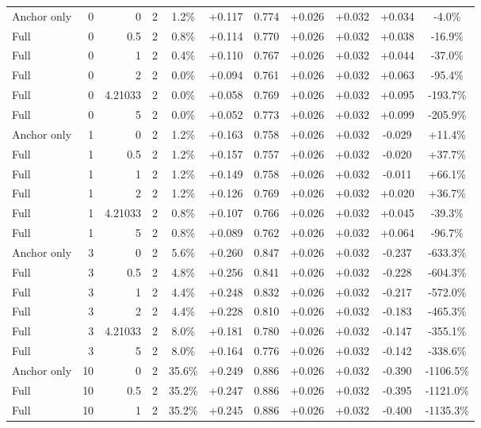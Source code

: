 \begin{table}[htbp]
\begin{tabular}{lrrrccccccc}
Anchor only & 0 & 0 & 2 & 1.2\% & +0.117 & 0.774 & +0.026 & +0.032 & +0.034 & -4.0\% \\
Full & 0 & 0.5 & 2 & 0.8\% & +0.114 & 0.770 & +0.026 & +0.032 & +0.038 & -16.9\% \\
Full & 0 & 1 & 2 & 0.4\% & +0.110 & 0.767 & +0.026 & +0.032 & +0.044 & -37.0\% \\
Full & 0 & 2 & 2 & 0.0\% & +0.094 & 0.761 & +0.026 & +0.032 & +0.063 & -95.4\% \\
Full & 0 & 4.21033 & 2 & 0.0\% & +0.058 & 0.769 & +0.026 & +0.032 & +0.095 & -193.7\% \\
Full & 0 & 5 & 2 & 0.0\% & +0.052 & 0.773 & +0.026 & +0.032 & +0.099 & -205.9\% \\
Anchor only & 1 & 0 & 2 & 1.2\% & +0.163 & 0.758 & +0.026 & +0.032 & -0.029 & +11.4\% \\
Full & 1 & 0.5 & 2 & 1.2\% & +0.157 & 0.757 & +0.026 & +0.032 & -0.020 & +37.7\% \\
Full & 1 & 1 & 2 & 1.2\% & +0.149 & 0.758 & +0.026 & +0.032 & -0.011 & +66.1\% \\
Full & 1 & 2 & 2 & 1.2\% & +0.126 & 0.769 & +0.026 & +0.032 & +0.020 & +36.7\% \\
Full & 1 & 4.21033 & 2 & 0.8\% & +0.107 & 0.766 & +0.026 & +0.032 & +0.045 & -39.3\% \\
Full & 1 & 5 & 2 & 0.8\% & +0.089 & 0.762 & +0.026 & +0.032 & +0.064 & -96.7\% \\
Anchor only & 3 & 0 & 2 & 5.6\% & +0.260 & 0.847 & +0.026 & +0.032 & -0.237 & -633.3\% \\
Full & 3 & 0.5 & 2 & 4.8\% & +0.256 & 0.841 & +0.026 & +0.032 & -0.228 & -604.3\% \\
Full & 3 & 1 & 2 & 4.4\% & +0.248 & 0.832 & +0.026 & +0.032 & -0.217 & -572.0\% \\
Full & 3 & 2 & 2 & 4.4\% & +0.228 & 0.810 & +0.026 & +0.032 & -0.183 & -465.3\% \\
Full & 3 & 4.21033 & 2 & 8.0\% & +0.181 & 0.780 & +0.026 & +0.032 & -0.147 & -355.1\% \\
Full & 3 & 5 & 2 & 8.0\% & +0.164 & 0.776 & +0.026 & +0.032 & -0.142 & -338.6\% \\
Anchor only & 10 & 0 & 2 & 35.6\% & +0.249 & 0.886 & +0.026 & +0.032 & -0.390 & -1106.5\% \\
Full & 10 & 0.5 & 2 & 35.2\% & +0.247 & 0.886 & +0.026 & +0.032 & -0.395 & -1121.0\% \\
Full & 10 & 1 & 2 & 35.2\% & +0.245 & 0.886 & +0.026 & +0.032 & -0.400 & -1135.3\% \\

\end{tabular}
\end{table}

